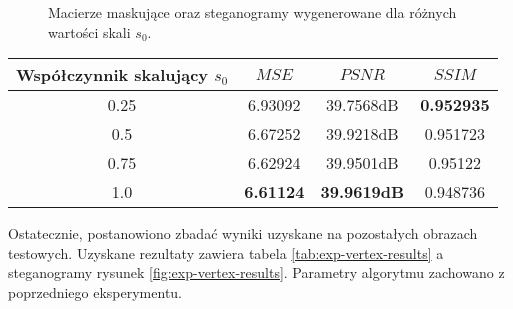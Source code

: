 {\begin{figure}
        \caption[Porównania wizualizacji konwersji oraz macierzy maskujących.]
        {
            Macierze maskujące oraz steganogramy wygenerowane dla różnych wartości skali $s_0$.
        }
        \label{fig:exp-vertex-scale}
    \end{figure}

    \begin{center}
        \begin{tabular}{ |c|c c c| }
            \hline
            Współczynnik skalujący \newline $s_0$ & $MSE$ & $PSNR$ & $SSIM$ \\
            \hline
            0.25 & 6.93092 & 39.7568dB & \textbf{0.952935} \\
            0.5 & 6.67252 & 39.9218dB & 0.951723 \\
            0.75 & 6.62924 & 39.9501dB & 0.95122 \\
            1.0 & \textbf{6.61124} & \textbf{39.9619dB} & 0.948736 \\
            \hline
        \end{tabular}
        \label{tab:exp-vertex-scale-errors}
    \end{center}

    Ostatecznie, postanowiono zbadać wyniki uzyskane na pozostałych obrazach testowych. Uzyskane rezultaty zawiera
    tabela \ref{tab:exp-vertex-results} a steganogramy rysunek \ref{fig:exp-vertex-results}. Parametry algorytmu
    zachowano z poprzedniego eksperymentu.

}
